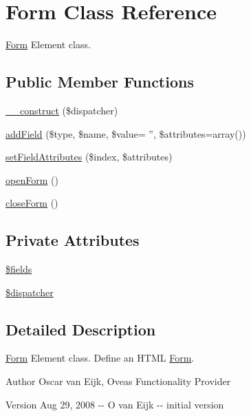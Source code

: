 \section{Form Class Reference}
\label{classForm}


\hyperlink{classForm}{Form} Element class.  


\subsection*{Public Member Functions}
\begin{DoxyCompactItemize}
\item 
\hyperlink{classForm_ad0247731b52213ae543452da25da005b}{\_\-\_\-construct} (\$dispatcher)
\item 
\hyperlink{classForm_a880197a858a70581146d6f0d275eff02}{addField} (\$type, \$name, \$value= '', \$attributes=array())
\item 
\hyperlink{classForm_a83cd5bed7649ecfe202dd97a8129f6f8}{setFieldAttributes} (\$index, \$attributes)
\item 
\hyperlink{classForm_a94902cc2869e1608247d9204036af7d1}{openForm} ()
\item 
\hyperlink{classForm_a9bb2df9ed7b866b0dc4b29b3874c2a1a}{closeForm} ()
\end{DoxyCompactItemize}
\subsection*{Private Attributes}
\begin{DoxyCompactItemize}
\item 
\hyperlink{classForm_abcb1c4022c2b93073a00ae65f3269d5b}{\$fields}
\item 
\hyperlink{classForm_ab02292e715af1dc9b0499dd20900aa92}{\$dispatcher}
\end{DoxyCompactItemize}


\subsection{Detailed Description}
\hyperlink{classForm}{Form} Element class. Define an HTML \hyperlink{classForm}{Form}. \begin{DoxyAuthor}{Author}
Oscar van Eijk, Oveas Functionality Provider 
\end{DoxyAuthor}
\begin{DoxyVersion}{Version}
Aug 29, 2008 -\/-\/ O van Eijk -\/-\/ initial version 
\end{DoxyVersion}


